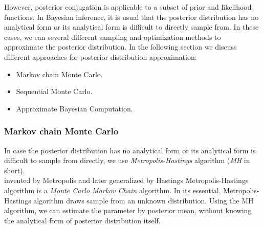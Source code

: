 However, posterior conjugation is applicable to a subset of prior and likelihood functions. In
Bayesian inference, it is usual that the posterior distribution has no analytical form or its
analytical form is difficult to directly sample from. In these cases, we can several different
sampling and optimization methods to approximate the posterior distribution. In the following
section we discuss different approaches for posterior distribution approximation:
\begin{itemize}
      \item Markov chain Monte Carlo.
      \item Sequential Monte Carlo.
      \item Approximate Bayesian Computation.
\end{itemize}

\subsubsection{Markov chain Monte Carlo}
In case the posterior distribution has no analytical form or its analytical form is difficult to
sample from directly, we use \textit{Metropolis-Hastings} algorithm  (\textit{MH} in short).\\
invented by Metropolis \cite{metropolis1953equation} and later generalized by Hastings \cite{hastings1970monte}
Metropolis-Hastings algorithm is a \textit{Monte Carlo Markov Chain} algorithm. In its essential,
Metropolis-Hastings algorithm draws sample from an unknown distribution. Using the MH algorithm, we
can estimate the parameter by posterior mean, without knowing the analytical form of posterior
distribution itself.

